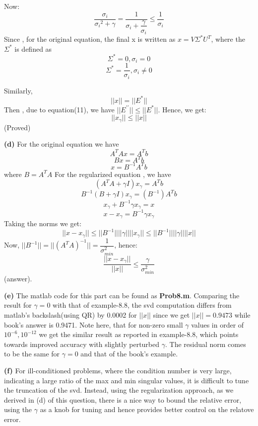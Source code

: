 \documentclass{article}
\renewcommand\part[1]{\vspace{.10in}\textbf{(#1)}}
\begin{document}
 Now:
 \begin{equation}
 \dfrac{\sigma_i}{{\sigma_i}^2 + \gamma} = \dfrac{1}{\sigma_i + \dfrac{\gamma}{\sigma_i}} \leq \dfrac{1}{\sigma_i}
\end{equation}
 Since , for the original equation, the final x is written as $x=V\Sigma^*U^T$, where the $\Sigma^*$ is defined as 
 \[\Sigma^* = 0 , \sigma_i = 0\]
 \[\Sigma^* = \dfrac{1}{\sigma_i} , \sigma_i \neq 0\]

 Similarly,
 \[||x|| = ||E^*||\]
 Then , due to equation(11), we have $||E^{\prime\prime}|| \leq ||E^*||$. Hence, we get:
 \begin{equation}
	 ||x_\gamma|| \leq ||x||
 \end{equation}
 (Proved)

 \part{d}
	 For the original equation we have 
	 \[A^TAx = A^Tb\]
	 \[Bx = A^Tb\]
	 \[x = B^{-1}A^Tb\]
	where $B = A^TA$
	 For the regularized equation , we have
	 \[(A^TA + \gamma I)x_\gamma = A^Tb\]
	 \[ B^{-1}(B + \gamma I)x_\gamma = (B^{-1})A^Tb\]
	 \[ x_\gamma + B^{-1}\gamma x_\gamma = x\]
	 \begin{equation}
	  x - x_\gamma = B^{-1}\gamma x_\gamma
	\end{equation}
	Taking the norms we get:
	\[||x - x_\gamma|| \leq ||B^{-1}||||\gamma||||x_\gamma|| \leq ||B^{-1}||||\gamma||||x||\]
	Now, $||B^{-1}|| = ||(A^TA)^{-1}|| =  \dfrac{1}{\sigma_{min}^2}$, hence:
	\[\dfrac{||x - x_\gamma||}{||x||} \leq \dfrac{\gamma}{\sigma_{min}^2}\]
	(answer).


\part{e}
   The matlab code for this part can be found as \textbf {Prob8.m}. Comparing the result for $\gamma = 0$ with that of example-8.8, the svd computation differs from matlab's backslash(using QR) by 0.0002 for $||x||$ since we get $||x||=0.9473$ while book's answer is 0.9471. Note here, that for non-zero small $\gamma$ values in order of $10^{-6}, 10^{-12}$ we get the similar result as reported in example-8.8, which points towards improved accuracy with slightly perturbed $\gamma$. The residual norm comes to be the same for $\gamma=0$ and that of the book's example. \newline


 \part{f} 
   For ill-conditioned problems, where the condition number is very large, indicating a large ratio of the max and min singular values, it is difficult to tune the truncation of the svd. Instead, using the regularization approach, as we derived in (d) of this question, there is a nice way to bound the relative error, using the $\gamma$ as a knob for tuning and hence provides better control on the relatove error. \newline
\end{document}
